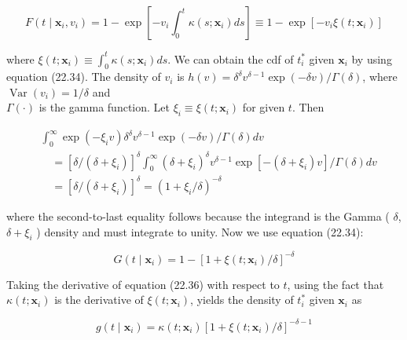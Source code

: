 \documentclass[10pt]{article}
\begin{document}
\begin{equation*}
F\left(t \mid \mathbf{x}_{i}, v_{i}\right)=1-\exp \left[-v_{i} \int_{0}^{t} \kappa\left(s ; \mathbf{x}_{i}\right) d s\right] \equiv 1-\exp \left[-v_{i} \xi\left(t ; \mathbf{x}_{i}\right)\right] \tag{22.35}
\end{equation*}


where $\xi\left(t ; \mathbf{x}_{i}\right) \equiv \int_{0}^{t} \kappa\left(s ; \mathbf{x}_{i}\right) d s$. We can obtain the cdf of $t_{i}^{*}$ given $\mathbf{x}_{i}$ by using equation (22.34). The density of $v_{i}$ is $h(v)=\delta^{\delta} v^{\delta-1} \exp (-\delta v) / \Gamma(\delta)$, where $\operatorname{Var}\left(v_{i}\right)=1 / \delta$ and\\
$\Gamma(\cdot)$ is the gamma function. Let $\xi_{i} \equiv \xi\left(t ; \mathbf{x}_{i}\right)$ for given $t$. Then

$$
\begin{aligned}
& \int_{0}^{\infty} \exp \left(-\xi_{i} v\right) \delta^{\delta} v^{\delta-1} \exp (-\delta v) / \Gamma(\delta) d v \\
& \quad=\left[\delta /\left(\delta+\xi_{i}\right)\right]^{\delta} \int_{0}^{\infty}\left(\delta+\xi_{i}\right)^{\delta} v^{\delta-1} \exp \left[-\left(\delta+\xi_{i}\right) v\right] / \Gamma(\delta) d v \\
& \quad=\left[\delta /\left(\delta+\xi_{i}\right)\right]^{\delta}=\left(1+\xi_{i} / \delta\right)^{-\delta}
\end{aligned}
$$

where the second-to-last equality follows because the integrand is the Gamma ( $\delta$, $\delta+\xi_{i}$ ) density and must integrate to unity. Now we use equation (22.34):


\begin{equation*}
G\left(t \mid \mathbf{x}_{i}\right)=1-\left[1+\xi\left(t ; \mathbf{x}_{i}\right) / \delta\right]^{-\delta} \tag{22.36}
\end{equation*}


Taking the derivative of equation (22.36) with respect to $t$, using the fact that $\kappa\left(t ; \mathbf{x}_{i}\right)$ is the derivative of $\xi\left(t ; \mathbf{x}_{i}\right)$, yields the density of $t_{i}^{*}$ given $\mathbf{x}_{i}$ as


\begin{equation*}
g\left(t \mid \mathbf{x}_{i}\right)=\kappa\left(t ; \mathbf{x}_{i}\right)\left[1+\xi\left(t ; \mathbf{x}_{i}\right) / \delta\right]^{-\delta-1} \tag{22.37}
\end{equation*}
\end{document}
